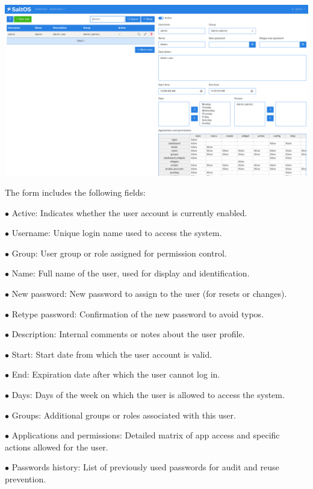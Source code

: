 \documentclass[a4paper]{article}
\begin{document}
\begin{center}\includegraphics[width=1\textwidth]{../ujest/snaps/test-screenshots-js-screenshots-users-users-edit-1-en-us-1-snap.png}\end{center}

The form includes the following fields:

\begin{compactitem}
\item[\color{myblue}$\bullet$] Active: Indicates whether the user account is currently enabled.
\item[\color{myblue}$\bullet$] Username: Unique login name used to access the system.
\item[\color{myblue}$\bullet$] Group: User group or role assigned for permission control.
\item[\color{myblue}$\bullet$] Name: Full name of the user, used for display and identification.
\item[\color{myblue}$\bullet$] New password: New password to assign to the user (for resets or changes).
\item[\color{myblue}$\bullet$] Retype password: Confirmation of the new password to avoid typos.
\item[\color{myblue}$\bullet$] Description: Internal comments or notes about the user profile.
\item[\color{myblue}$\bullet$] Start: Start date from which the user account is valid.
\item[\color{myblue}$\bullet$] End: Expiration date after which the user cannot log in.
\item[\color{myblue}$\bullet$] Days: Days of the week on which the user is allowed to access the system.
\item[\color{myblue}$\bullet$] Groups: Additional groups or roles associated with this user.
\item[\color{myblue}$\bullet$] Applications and permissions: Detailed matrix of app access and specific actions allowed for the user.
\item[\color{myblue}$\bullet$] Passwords history: List of previously used passwords for audit and reuse prevention.
\end{compactitem}
\end{document}
